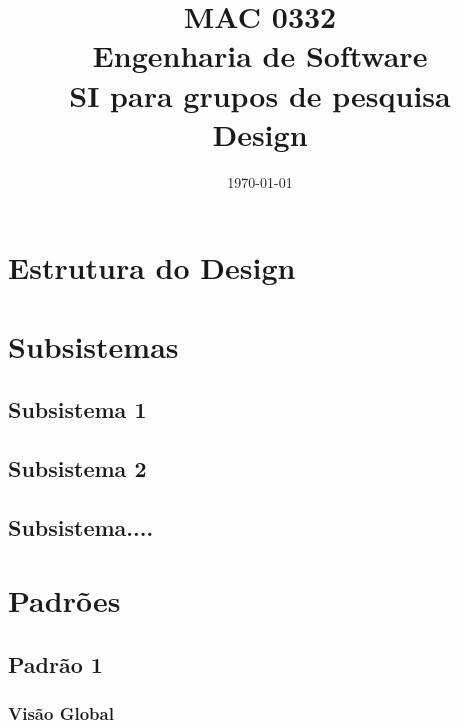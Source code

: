 \documentclass[11pt, a4paper]{article}
\title{MAC 0332\\
	Engenharia de Software\\
	SI para grupos de pesquisa\\
	Design}
\date{\today}
\begin{document}
	\maketitle
	\newpage
	
	\section{Estrutura do Design}
	\section{Subsistemas}
            \subsection{Subsistema 1}
            
            \subsection{Subsistema 2}
            
            \subsection{Subsistema....}

	\section{Padrões}
        \subsection{Padrão 1}
		
		    \subsubsection{Visão Global}
		
\end{document}
